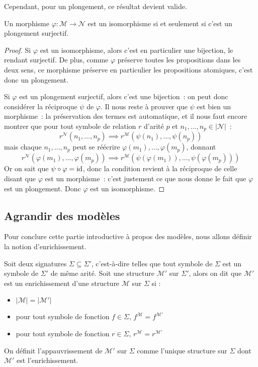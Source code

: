 Cependant, pour un plongement, ce résultat devient valide.

\begin{proposition}
  Un morphisme $\varphi : \mathcal M \to \mathcal N$ est un isomorphisme si et
  seulement si c'est un plongement surjectif.
\end{proposition}

\begin{proof}
  Si $\varphi$ est un isomorphisme, alors c'est en particulier une bijection,
  le rendant surjectif. De plus, comme $\varphi$ préserve toutes les
  propositions dans les deux sens, ce morphisme préserve en particulier les
  propositions atomiques, c'est donc un plongement.

  Si $\varphi$ est un plongement surjectif, alors c'est une bijection~: on
  peut donc considérer la réciproque $\psi$ de $\varphi$. Il nous reste à
  prouver que $\psi$ est bien un morphisme~: la préservation des termes est
  automatique, et il nous faut encore montrer que pour tout symbole de relation
  $r$ d'arité $p$ et $n_1,\ldots,n_p\in|\mathcal N|$~:
  \[r^\mathcal N(n_1,\ldots,n_p) \implies r^\mathcal M
  (\psi(n_1),\ldots,\psi(n_p))\]
  mais chaque $n_1,\ldots,n_p$ peut se réécrire
  $\varphi(m_1),\ldots,\varphi(m_p)$, donnant
  \[r^\mathcal N(\varphi(m_1),\ldots,\varphi(m_p)) \implies r^\mathcal M
  (\psi(\varphi(m_1)),\ldots,\psi(\varphi(m_p)))\]
  Or on sait que $\psi\circ \varphi = \operatorname{id}$, donc la condition revient à la
  réciproque de celle disant que $\varphi$ est un morphisme~: c'est justement
  ce que nous donne le fait que $\varphi$ est un plongement. Donc $\varphi$ est
  un isomorphisme.
\end{proof}

\subsection{Agrandir des modèles}

Pour conclure cette partie introductive à propos des modèles, nous allons
définir la notion d'enrichissement.

\begin{definition}[Enrichissement]
  Soit deux signatures $\Sigma\subseteq\Sigma'$, c'est-à-dire telles que tout
  symbole de $\Sigma$ est un symbole de $\Sigma'$ de même arité. Soit une
  structure $\mathcal M'$ sur $\Sigma'$, alors on dit que $\mathcal M'$ est un
  enrichissement d'une structure $\mathcal M$ sur $\Sigma$ si :
  \begin{itemize}
  \item $|\mathcal M| = |\mathcal M'|$
  \item pour tout symbole de fonction $f\in \Sigma$,
    $f^{\mathcal M} = f^{\mathcal M'}$
  \item pour tout symbole de fonction $r\in \Sigma$,
    $r^{\mathcal M} = r^{\mathcal M'}$
  \end{itemize}

  On définit l'appauvrissement de $\mathcal M'$ sur $\Sigma$ comme l'unique
  structure sur $\Sigma$ dont $\mathcal M'$ est l'enrichissement.
\end{definition}

